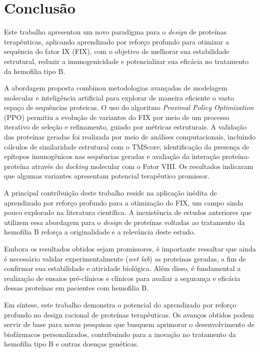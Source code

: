 \chapter{Conclusão}

Este trabalho apresentou um novo paradigma para o \textit{design} de proteínas terapêuticas,
aplicando aprendizado por reforço profundo para otimizar a sequência do fator IX (FIX),
com o objetivo de melhorar sua estabilidade estrutural, 
reduzir a imunogenicidade e potencializar sua eficácia no tratamento da hemofilia tipo B.  

A abordagem proposta combinou metodologias avançadas de modelagem molecular e inteligência artificial 
para explorar de maneira eficiente o vasto espaço de sequências proteicas. 
O uso do algoritmo \textit{Proximal Policy Optimization} (PPO) permitiu a evolução de variantes do FIX 
por meio de um processo iterativo de seleção e refinamento, 
guiado por métricas estruturais. 
A validação das proteínas geradas foi realizada por meio de análises computacionais, 
incluindo cálculos de similaridade estrutural com o TMScore, identificação da presença de epítopos imunogênicos nas sequências geradas
e avaliação da interação proteína-proteína através do \textit{docking} molecular com o Fator VIII.
Os resultados indicaram que algumas variantes apresentam potencial terapêutico promissor.  

A principal contribuição deste trabalho reside na aplicação inédita de aprendizado por reforço profundo
para a otimização do FIX, um campo ainda pouco explorado na literatura científica. 
A inexistência de estudos anteriores que utilizem essa abordagem para o \textit{design} de proteínas 
voltadas ao tratamento da hemofilia B reforça a originalidade e a relevância deste estudo.  

Embora os resultados obtidos sejam promissores, 
é importante ressaltar que ainda é necessário validar experimentalmente (\textit{wet lab})
as proteínas geradas, a fim de confirmar sua estabilidade e atividade biológica.
Além disso, é fundamental a realização de ensaios pré-clínicos e clínicos
para avaliar a segurança e eficácia dessas proteínas em pacientes com hemofilia B.

Em síntese, este trabalho demonstra o potencial do aprendizado por reforço profundo no design racional
de proteínas terapêuticas. 
Os avanços obtidos podem servir de base para novas pesquisas que busquem aprimorar o 
desenvolvimento de biofármacos personalizados, 
contribuindo para a inovação no tratamento da hemofilia tipo B e outras doenças genéticas.

